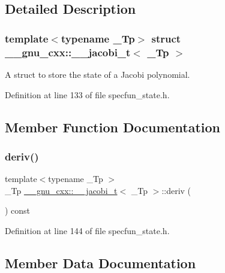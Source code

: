 \subsection{Detailed Description}
\subsubsection*{template$<$typename \+\_\+\+Tp$>$\newline
struct \+\_\+\+\_\+gnu\+\_\+cxx\+::\+\_\+\+\_\+jacobi\+\_\+t$<$ \+\_\+\+Tp $>$}

A struct to store the state of a Jacobi polynomial. 

Definition at line 133 of file specfun\+\_\+state.\+h.



\subsection{Member Function Documentation}
\mbox{\label{struct____gnu__cxx_1_1____jacobi__t_a2b1a1fc42308cb293dfcb1fa4a8202a6}} 
\subsubsection{\texorpdfstring{deriv()}{deriv()}}
{\footnotesize\ttfamily template$<$typename \+\_\+\+Tp $>$ \\
\+\_\+\+Tp \hyperlink{struct____gnu__cxx_1_1____jacobi__t}{\+\_\+\+\_\+gnu\+\_\+cxx\+::\+\_\+\+\_\+jacobi\+\_\+t}$<$ \+\_\+\+Tp $>$\+::deriv (\begin{DoxyParamCaption}{ }\end{DoxyParamCaption}) const\hspace{0.3cm}{\ttfamily [inline]}}



Definition at line 144 of file specfun\+\_\+state.\+h.



\subsection{Member Data Documentation}
\mbox{\label{struct____gnu__cxx_1_1____jacobi__t_ab81da2815aa171345bf3893855b8c9a6}} 
